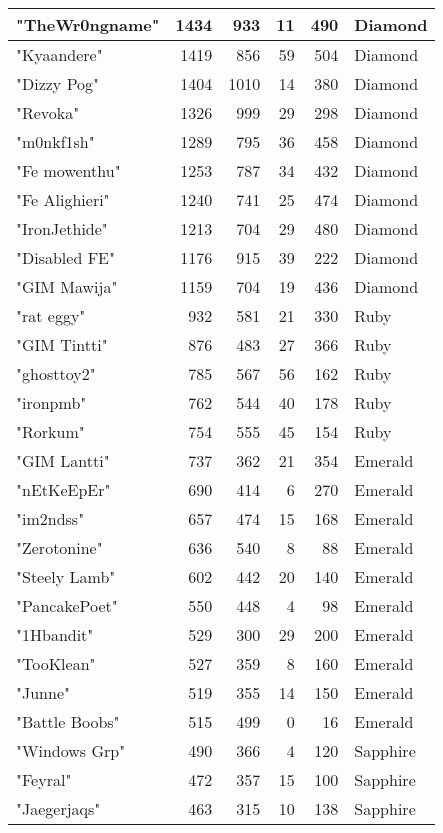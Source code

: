 \documentclass{article}
\begin{document}
\begin{table}[htbp]
\begin{tabular}{|l|r|r|r|r|l|}
"TheWr0ngname" & 1434 & 933 & 11 & 490 & Diamond \\ \hline
"Kyaandere" & 1419 & 856 & 59 & 504 & Diamond \\ \hline
"Dizzy Pog" & 1404 & 1010 & 14 & 380 & Diamond \\ \hline
"Revoka" & 1326 & 999 & 29 & 298 & Diamond \\ \hline
"m0nkf1sh" & 1289 & 795 & 36 & 458 & Diamond \\ \hline
"Fe mowenthu" & 1253 & 787 & 34 & 432 & Diamond \\ \hline
"Fe Alighieri" & 1240 & 741 & 25 & 474 & Diamond \\ \hline
"IronJethide" & 1213 & 704 & 29 & 480 & Diamond \\ \hline
"Disabled FE" & 1176 & 915 & 39 & 222 & Diamond \\ \hline
"GIM Mawija" & 1159 & 704 & 19 & 436 & Diamond \\ \hline
"rat eggy" & 932 & 581 & 21 & 330 & Ruby \\ \hline
"GIM Tintti" & 876 & 483 & 27 & 366 & Ruby \\ \hline
"ghosttoy2" & 785 & 567 & 56 & 162 & Ruby \\ \hline
"ironpmb" & 762 & 544 & 40 & 178 & Ruby \\ \hline
"Rorkum" & 754 & 555 & 45 & 154 & Ruby \\ \hline
"GIM Lantti" & 737 & 362 & 21 & 354 & Emerald \\ \hline
"nEtKeEpEr" & 690 & 414 & 6 & 270 & Emerald \\ \hline
"im2ndss" & 657 & 474 & 15 & 168 & Emerald \\ \hline
"Zerotonine" & 636 & 540 & 8 & 88 & Emerald \\ \hline
"Steely Lamb" & 602 & 442 & 20 & 140 & Emerald \\ \hline
"PancakePoet" & 550 & 448 & 4 & 98 & Emerald \\ \hline
"1Hbandit" & 529 & 300 & 29 & 200 & Emerald \\ \hline
"TooKlean" & 527 & 359 & 8 & 160 & Emerald \\ \hline
"Junne" & 519 & 355 & 14 & 150 & Emerald \\ \hline
"Battle Boobs" & 515 & 499 & 0 & 16 & Emerald \\ \hline
"Windows Grp" & 490 & 366 & 4 & 120 & Sapphire \\ \hline
"Feyral" & 472 & 357 & 15 & 100 & Sapphire \\ \hline
"Jaegerjaqs" & 463 & 315 & 10 & 138 & Sapphire \\ \hline

\end{tabular}
\end{table}
\end{document}
